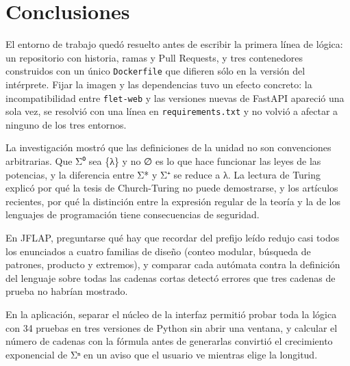 \hypertarget{conclusiones}{%
\section{Conclusiones}\label{conclusiones}}

El entorno de trabajo quedó resuelto antes de escribir la primera línea de lógica: un repositorio con historia, ramas y Pull Requests, y tres contenedores construidos con un único \texttt{Dockerfile} que difieren sólo en la versión del intérprete. Fijar la imagen y las dependencias tuvo un efecto concreto: la incompatibilidad entre \texttt{flet-web} y las versiones nuevas de FastAPI apareció una sola vez, se resolvió con una línea en \texttt{requirements.txt} y no volvió a afectar a ninguno de los tres entornos.

La investigación mostró que las definiciones de la unidad no son convenciones arbitrarias. Que Σ⁰ sea \{λ\} y no ∅ es lo que hace funcionar las leyes de las potencias, y la diferencia entre Σ* y Σ⁺ se reduce a λ. La lectura de Turing explicó por qué la tesis de Church-Turing no puede demostrarse, y los artículos recientes, por qué la distinción entre la expresión regular de la teoría y la de los lenguajes de programación tiene consecuencias de seguridad.

En JFLAP, preguntarse qué hay que recordar del prefijo leído redujo casi todos los enunciados a cuatro familias de diseño (conteo modular, búsqueda de patrones, producto y extremos), y comparar cada autómata contra la definición del lenguaje sobre todas las cadenas cortas detectó errores que tres cadenas de prueba no habrían mostrado.

En la aplicación, separar el núcleo de la interfaz permitió probar toda la lógica con 34 pruebas en tres versiones de Python sin abrir una ventana, y calcular el número de cadenas con la fórmula antes de generarlas convirtió el crecimiento exponencial de \textbar Σ\textbar ⁿ en un aviso que el usuario ve mientras elige la longitud.
